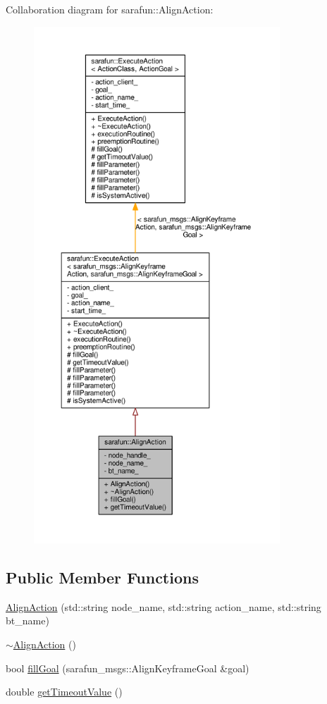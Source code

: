 Collaboration diagram for sarafun\-:\-:Align\-Action\-:
\nopagebreak
\begin{figure}[H]
\begin{center}
\leavevmode
\includegraphics[height=550pt]{d2/d13/classsarafun_1_1AlignAction__coll__graph}
\end{center}
\end{figure}
\subsection*{Public Member Functions}
\begin{DoxyCompactItemize}
\item 
\hyperlink{classsarafun_1_1AlignAction_a013ed290585167a2693728565a764205_a013ed290585167a2693728565a764205}{Align\-Action} (std\-::string node\-\_\-name, std\-::string action\-\_\-name, std\-::string bt\-\_\-name)
\item 
\hyperlink{classsarafun_1_1AlignAction_a0fdb2f1de94801608024fb7dddd84f57_a0fdb2f1de94801608024fb7dddd84f57}{$\sim$\-Align\-Action} ()
\item 
bool \hyperlink{classsarafun_1_1AlignAction_ab92a62085ebd60438638b7b6c56da786_ab92a62085ebd60438638b7b6c56da786}{fill\-Goal} (sarafun\-\_\-msgs\-::\-Align\-Keyframe\-Goal \&goal)
\item 
double \hyperlink{classsarafun_1_1AlignAction_a9b9741ec3203bdc1b2e7b7cecc96e6ed_a9b9741ec3203bdc1b2e7b7cecc96e6ed}{get\-Timeout\-Value} ()
\end{DoxyCompactItemize}
